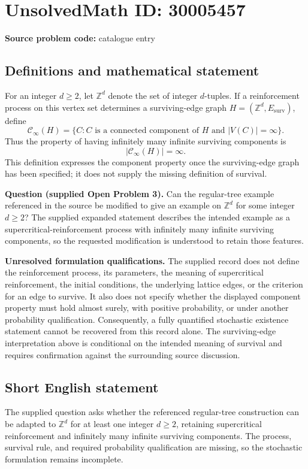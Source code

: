 \documentclass[11pt]{article}
\newcommand{\Z}{\mathbb{Z}}
\begin{document}
\section*{UnsolvedMath ID: 30005457}
\textbf{Source problem code:} catalogue entry
\subsection{Definitions and mathematical statement}
For an integer \(d\geq 2\), let \(\Z^d\) denote the set of integer \(d\)-tuples. If a reinforcement process on this vertex set determines a surviving-edge graph \(H=(\Z^d,E_{\mathrm{surv}})\), define
\[
\mathcal C_\infty(H)=\{C:C\text{ is a connected component of }H\text{ and }|V(C)|=\infty\}.
\]
Thus the property of having infinitely many infinite surviving components is
\[
|\mathcal C_\infty(H)|=\infty.
\]
This definition expresses the component property once the surviving-edge graph has been specified; it does not supply the missing definition of survival.

\textbf{Question (supplied Open Problem 3).} Can the regular-tree example referenced in the source be modified to give an example on \(\Z^d\) for some integer \(d\geq 2\)? The supplied expanded statement describes the intended example as a supercritical-reinforcement process with infinitely many infinite surviving components, so the requested modification is understood to retain those features.

\textbf{Unresolved formulation qualifications.} The supplied record does not define the reinforcement process, its parameters, the meaning of supercritical reinforcement, the initial conditions, the underlying lattice edges, or the criterion for an edge to survive. It also does not specify whether the displayed component property must hold almost surely, with positive probability, or under another probability qualification. Consequently, a fully quantified stochastic existence statement cannot be recovered from this record alone. The surviving-edge interpretation above is conditional on the intended meaning of survival and requires confirmation against the surrounding source discussion.
\subsection{Short English statement}
The supplied question asks whether the referenced regular-tree construction can be adapted to \(\Z^d\) for at least one integer \(d\geq 2\), retaining supercritical reinforcement and infinitely many infinite surviving components. The process, survival rule, and required probability qualification are missing, so the stochastic formulation remains incomplete.
\end{document}
